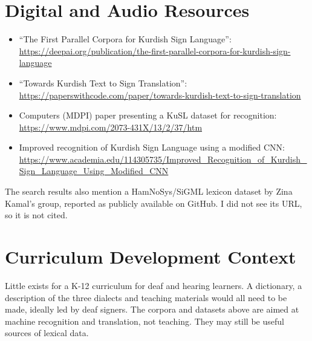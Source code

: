 \documentclass[12pt]{article}
\begin{document}
\section{Digital and Audio Resources}
\begin{itemize}
\item ``The First Parallel Corpora for Kurdish Sign Language'': \url{https://deepai.org/publication/the-first-parallel-corpora-for-kurdish-sign-language}
\item ``Towards Kurdish Text to Sign Translation'': \url{https://paperswithcode.com/paper/towards-kurdish-text-to-sign-translation}
\item Computers (MDPI) paper presenting a KuSL dataset for recognition: \url{https://www.mdpi.com/2073-431X/13/2/37/htm}
\item Improved recognition of Kurdish Sign Language using a modified CNN: \url{https://www.academia.edu/114305735/Improved_Recognition_of_Kurdish_Sign_Language_Using_Modified_CNN}
\end{itemize}
The search results also mention a HamNoSys/SiGML lexicon dataset by Zina Kamal's group, reported as publicly available on GitHub. I did not see its URL, so it is not cited.

\section{Curriculum Development Context}
Little exists for a K-12 curriculum for deaf and hearing learners. A dictionary, a description of the three dialects and teaching materials would all need to be made, ideally led by deaf signers. The corpora and datasets above are aimed at machine recognition and translation, not teaching. They may still be useful sources of lexical data.
\end{document}
